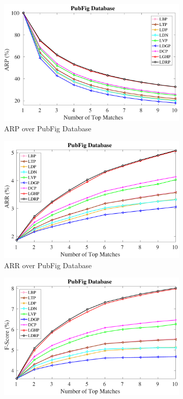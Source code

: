 \documentclass[a4paper]{article}
\begin{document}
\begin{figure}[!t]
  \begin{subfigure}{.25\textwidth}
    \centering
    \includegraphics[width=.98\linewidth]{pubfig-arp}
    \caption{ARP over PubFig Database}
    \label{fig:pubfig-arp}
  \end{subfigure}%
    \begin{subfigure}{.25\textwidth}
    \centering
    \includegraphics[width=.98\linewidth]{pubfig-arr}
    \caption{ARR over PubFig Database}
    \label{fig:pubfig-arr}
  \end{subfigure}%
    \begin{subfigure}{.25\textwidth}
    \centering
    \includegraphics[width=.98\linewidth]{pubfig-f}

\end{subfigure}
\end{figure}
\end{document}
